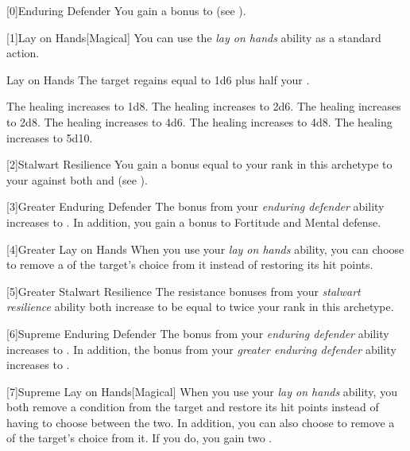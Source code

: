         [0]{Enduring Defender} You gain a  bonus to  (see ).

        [1]{Lay on Hands}[Magical] You can use the \textit{lay on hands} ability as a standard action.
        \begin{freeability}{Lay on Hands}
            The target regains  equal to 1d6 plus half your .

            \rankline
             The healing increases to 1d8.
             The healing increases to 2d6.
             The healing increases to 2d8.
             The healing increases to 4d6.
             The healing increases to 4d8.
             The healing increases to 5d10.
        \end{freeability}

        [2]{Stalwart Resilience} You gain a bonus equal to your rank in this archetype to your  against both  and  (see ).

        [3]{Greater Enduring Defender} The bonus from your \textit{enduring defender} ability increases to .
        In addition, you gain a  bonus to Fortitude and Mental defense.

        [4]{Greater Lay on Hands} When you use your \textit{lay on hands} ability, you can choose to remove a  of the target's choice from it instead of restoring its hit points.

        [5]{Greater Stalwart Resilience} The resistance bonuses from your \textit{stalwart resilience} ability both increase to be equal to twice your rank in this archetype.

        [6]{Supreme Enduring Defender} The bonus from your \textit{enduring defender} ability increases to .
        In addition, the bonus from your \textit{greater enduring defender} ability increases to .

        [7]{Supreme Lay on Hands}[Magical] When you use your \textit{lay on hands} ability, you both remove a condition from the target and restore its hit points instead of having to choose between the two.
        In addition, you can also choose to remove a  of the target's choice from it.
        If you do, you gain two .

